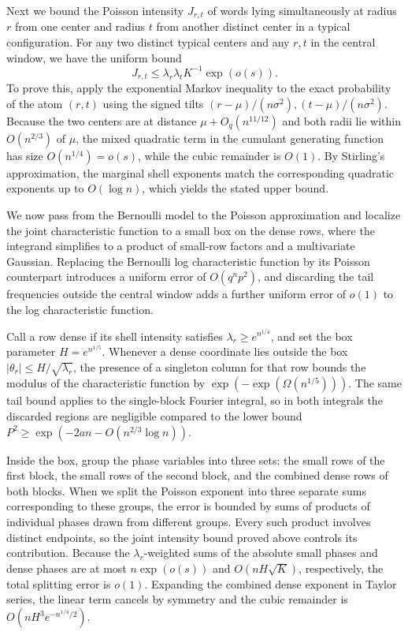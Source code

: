 Next we bound the Poisson intensity \(J_{r,t}\) of words lying simultaneously at radius \(r\) from one center and radius \(t\) from another distinct center in a typical configuration. For any two distinct typical centers and any \(r,t\) in the central window, we have the uniform bound
\[
 J_{r,t}\le \lambda_r\lambda_t K^{-1}\exp(o(s)).
\]
To prove this, apply the exponential Markov inequality to the exact probability of the atom \((r,t)\) using the signed tilts \((r-\mu)/(n\sigma^2),(t-\mu)/(n\sigma^2)\). Because the two centers are at distance \(\mu+O_q(n^{11/12})\) and both radii lie within \(O(n^{2/3})\) of \(\mu\), the mixed quadratic term in the cumulant generating function has size \(O(n^{1/4})=o(s)\), while the cubic remainder is \(O(1)\). By Stirling's approximation, the marginal shell exponents match the corresponding quadratic exponents up to \(O(\log n)\), which yields the stated upper bound.

We now pass from the Bernoulli model to the Poisson approximation and localize the joint characteristic function to a small box on the dense rows, where the integrand simplifies to a product of small-row factors and a multivariate Gaussian. Replacing the Bernoulli log characteristic function by its Poisson counterpart introduces a uniform error of \(O(q^np^2)\), and discarding the tail frequencies outside the central window adds a further uniform error of \(o(1)\) to the log characteristic function.

Call a row dense if its shell intensity satisfies \(\lambda_r\ge e^{n^{1/4}}\), and set the box parameter \(H=e^{n^{1/5}}\). Whenever a dense coordinate lies outside the box \(|\theta_r|\le H/\sqrt{\lambda_r}\), the presence of a singleton column for that row bounds the modulus of the characteristic function by \(\exp(-\exp(\Omega(n^{1/5})))\). The same tail bound applies to the single-block Fourier integral, so in both integrals the discarded regions are negligible compared to the lower bound \(P^2\ge\exp(-2an-O(n^{2/3}\log n))\).

Inside the box, group the phase variables into three sets: the small rows of the first block, the small rows of the second block, and the combined dense rows of both blocks. When we split the Poisson exponent into three separate sums corresponding to these groups, the error is bounded by sums of products of individual phases drawn from different groups. Every such product involves distinct endpoints, so the joint intensity bound proved above controls its contribution. Because the \(\lambda_r\)-weighted sums of the absolute small phases and dense phases are at most \(n\exp(o(s))\) and \(O(nH\sqrt K)\), respectively, the total splitting error is \(o(1)\). Expanding the combined dense exponent in Taylor series, the linear term cancels by symmetry and the cubic remainder is \(O(nH^3e^{-n^{1/4}/2})\).


